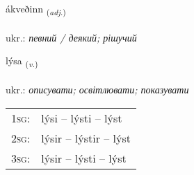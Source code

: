 \documentclass[frontgrid, backgrid]{flacards}\usepackage[]{graphicx}\usepackage[]{xcolor}
\begin{document}
\renewcommand{\flhead}{\vskip5pt \fboxsep=0pt {\small\bfseries\footnotesize Lýsingarorð | прикметник}}
\renewcommand{\fcfoot}{\vskip5pt \fboxsep=0pt \hspace{2pt}{\small\bfseries\footnotesize 1K}}

\renewcommand{\blhead}{\vskip5pt {\small\bfseries\footnotesize Lýsingarorð | прикметник }}
\renewcommand{\bcfoot}{\vskip5pt \hspace{2pt}{\small\bfseries\footnotesize 1K}}


{ákveðinn \small{\textsubscript{(\textit{adj.})}} \\[1ex] %
\textphonetic{[auːkʰvɛðɪn]} \\
ukr.: \emph{певний / деякий; рішучий} \\  [2ex]
\renewcommand*{\arraystretch}{0.8}
}

\renewcommand{\flhead}{\vskip5pt \fboxsep=0pt {\small\bfseries\footnotesize Sagnorð | дієслово}}
\renewcommand{\fcfoot}{\vskip5pt \fboxsep=0pt \hspace{2pt}{\small\bfseries\footnotesize 1K}}

\renewcommand{\blhead}{\vskip5pt {\small\bfseries\footnotesize Sagnorð | дієслово }}
\renewcommand{\bcfoot}{\vskip5pt \hspace{2pt}{\small\bfseries\footnotesize 1K}}


{lýsa \small{\textsubscript{(\textit{v.})}} \\[1ex] %
\textphonetic{[liːsa]} \\
ukr.: \emph{описувати; освітлювати; показувати} \\  [2ex]
\renewcommand*{\arraystretch}{0.8}
\begin{tabular}{p{1cm}l}
\textsc{1sg}: & lýsi -- lýsti -- lýst \\ 
\textsc{2sg}: & lýsir -- lýstir -- lýst \\ 
\textsc{3sg}: & lýsir -- lýsti -- lýst \\ 
\end{tabular}
}
\end{document}

